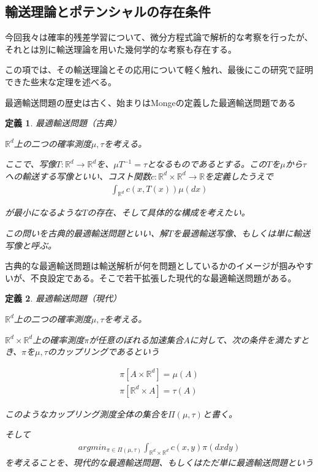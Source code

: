 \documentclass{jsarticle}
\newtheorem{defi}{定義}[section]
\begin{document}
\subsection{輸送理論とポテンシャルの存在条件}
今回我々は確率的残差学習について、微分方程式論で解析的な考察を行ったが、それとは別に輸送理論を用いた幾何学的な考察も存在する。

この項では、その輸送理論とその応用について軽く触れ、最後にこの研究で証明できた些末な定理を述べる。

最適輸送問題の歴史は古く、始まりはMongeの定義した最適輸送問題である

\begin{defi} 最適輸送問題（古典）

$\mathbb{R}^d$上の二つの確率測度$\mu,\tau$を考える。

ここで、写像$T:\mathbb{R}^d\to\mathbb{R}^d$を、$\mu T^{-1}=\tau$となるものであるとする。この$T$を$\mu$から$\tau$への輸送する写像といい、コスト関数$c:\mathbb{R}^d\times\mathbb{R}^d\to\mathbb{R}$を定義したうえで
\begin{align}
\int_{\mathbb{R}^d}c(x,T(x))\mu(dx)
\end{align}

が最小になるような$T$の存在、そして具体的な構成を考えたい。

この問いを古典的最適輸送問題といい、解$T$を最適輸送写像、もしくは単に輸送写像と呼ぶ。

\end{defi}


古典的な最適輸送問題は輸送解析が何を問題としているかのイメージが掴みやすいが、不良設定である。そこで若干拡張した現代的な最適輸送問題がある。

\begin{defi} 最適輸送問題（現代）

$\mathbb{R}^d$上の二つの確率測度$\mu,\tau$を考える。

$\mathbb{R}^d\times \mathbb{R}^d$上の確率測度$\pi$が任意のぼれる加速集合$A$に対して、次の条件を満たすとき、$\pi$を$\mu,\tau$のカップリングであるという

\begin{align}
\pi[A\times\mathbb{R}^d]=\mu(A)\\
\pi[\mathbb{R}^d\times A]=\tau(A)
\end{align}

このようなカップリング測度全体の集合を$\Pi(\mu,\tau)$と書く。

そして
\begin{align}
argmin_{\pi\in\Pi(\mu,\tau)}\int_{\mathbb{R}^d\times\mathbb{R}^d}c(x,y)\pi(dxdy)
\end{align}
を考えることを、現代的な最適輸送問題、もしくはただ単に最適輸送問題という

\end{defi}
\end{document}

